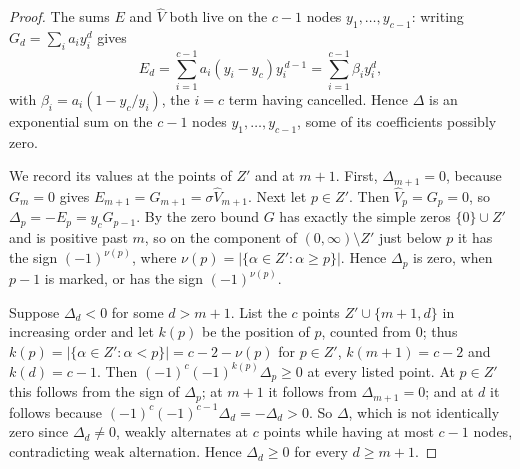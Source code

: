 \documentclass[11pt]{article}
\begin{document}
\begin{proof}
The sums $E$ and $\widehat V$ both live on the $c-1$ nodes
$y_1,\ldots,y_{c-1}$: writing $G_d=\sum_ia_iy_i^d$ gives
\[
  E_d=\sum_{i=1}^{c-1}a_i(y_i-y_c)y_i^{\,d-1}
      =\sum_{i=1}^{c-1}\beta_iy_i^d,
\]
with $\beta_i=a_i(1-y_c/y_i)$, the $i=c$ term having cancelled.  Hence $\Delta$
is an exponential sum on the $c-1$ nodes $y_1,\ldots,y_{c-1}$, some of its
coefficients possibly zero.

We record its values at the points of $Z'$ and at $m+1$.  First,
$\Delta_{m+1}=0$, because $G_m=0$ gives $E_{m+1}=G_{m+1}=\sigma\widehat
V_{m+1}$.  Next let $p\in Z'$.  Then $\widehat V_p=G_p=0$, so
$\Delta_p=-E_p=y_cG_{p-1}$.  By the zero bound $G$ has exactly the simple
zeros $\{0\}\cup Z'$ and is positive past $m$, so on the component of
$(0,\infty)\setminus Z'$ just below $p$ it has the sign $(-1)^{\nu(p)}$, where
$\nu(p)=|\{\alpha\in Z':\alpha\ge p\}|$.  Hence $\Delta_p$ is zero, when $p-1$
is marked, or has the sign $(-1)^{\nu(p)}$.

Suppose $\Delta_d<0$ for some $d>m+1$.  List the $c$ points
$Z'\cup\{m+1,d\}$ in increasing order and let $k(p)$ be the position of $p$,
counted from $0$; thus $k(p)=|\{\alpha\in Z':\alpha<p\}|=c-2-\nu(p)$ for
$p\in Z'$, $k(m+1)=c-2$ and $k(d)=c-1$.  Then
$(-1)^c(-1)^{k(p)}\Delta_p\ge0$ at every listed point.  At $p\in Z'$ this
follows from the sign of $\Delta_p$; at $m+1$ it follows from
$\Delta_{m+1}=0$; and at $d$ it follows because
$(-1)^c(-1)^{c-1}\Delta_d=-\Delta_d>0$.  So $\Delta$, which is not
identically zero since $\Delta_d\ne0$, weakly alternates at $c$ points
while having at most $c-1$ nodes, contradicting weak alternation.  Hence
$\Delta_d\ge0$ for every $d\ge m+1$.
\end{proof}
\end{document}
